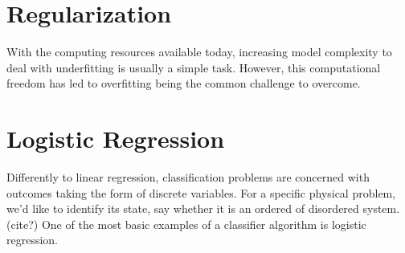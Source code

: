 \section{Regularization}\label{section:regularization}
With the computing resources available today, increasing model complexity to deal with underfitting is
usually a simple task. However, this computational freedom has led to overfitting being the common challenge
to overcome.


%
%
%
%
%
%
\section{Logistic Regression}\label{seq:logistic}
Differently to linear regression, classification problems
are concerned with outcomes taking the form of discrete variables.
For a specific physical problem, we'd like to identify its state, say whether
it is an ordered of disordered system. (cite?) One of the most basic examples
of a classifier algorithm is logistic regression.

